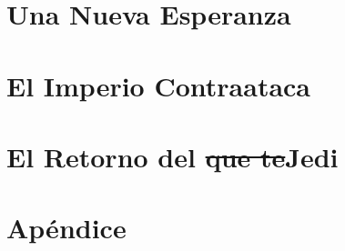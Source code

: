 \documentclass[hidelinks,a4paper,12pt, nofootinbib]{article}
\begin{document}
\maketitle

\tableofcontents
\newpage

\section{Una Nueva Esperanza}

\newpage

\section{El Imperio Contraataca}

\newpage

\section{ El Retorno del \texorpdfstring{\st{que te}} \\ Jedi}

\newpage
\section{Apéndice}


\newpage
\printbibliography
\end{document}
